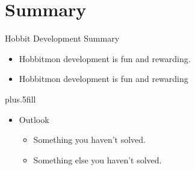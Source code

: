 \documentclass{beamer}
\begin{document}
\section*{Summary}

\begin{frame}{Hobbit Development Summary}

  \begin{itemize}
  \item
    Hobbitmon development is fun and rewarding.
  \item
    Hobbitmon development is fun and rewarding
  \end{itemize}
  
  \vskip0pt plus.5fill
  \begin{itemize}
  \item
    Outlook
    \begin{itemize}
    \item
      Something you haven't solved.
    \item
      Something else you haven't solved.
    \end{itemize}
  \end{itemize}
\end{frame}
\end{document}
